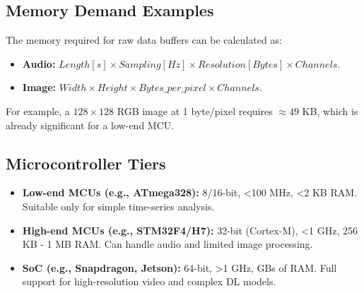 \subsection{Memory Demand Examples}
The memory required for raw data buffers can be calculated as:
\begin{itemize}
    \item \textbf{Audio:} $Length [s] \times Sampling [Hz] \times Resolution [Bytes] \times Channels$.
    \item \textbf{Image:} $Width \times Height \times Bytes\_per\_pixel \times Channels$.
\end{itemize}
For example, a $128 \times 128$ RGB image at 1 byte/pixel requires $\approx 49$ KB, which is already significant for a low-end MCU.

\subsection{Microcontroller Tiers}
\begin{itemize}
    \item \textbf{Low-end MCUs (e.g., ATmega328):} 8/16-bit, <100 MHz, <2 KB RAM. Suitable only for simple time-series analysis.
    \item \textbf{High-end MCUs (e.g., STM32F4/H7):} 32-bit (Cortex-M), <1 GHz, 256 KB - 1 MB RAM. Can handle audio and limited image processing.
    \item \textbf{SoC (e.g., Snapdragon, Jetson):} 64-bit, >1 GHz, GBs of RAM. Full support for high-resolution video and complex DL models.
\end{itemize}
